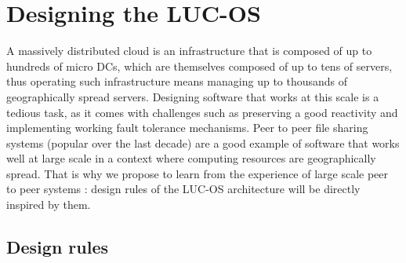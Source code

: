 \section{Designing the LUC-OS}
\label{sec:lucos}

A massively distributed cloud is an infrastructure that is composed of up to 
hundreds of micro DCs, which are themselves composed of up to tens of servers, 
thus operating such infrastructure means managing up to thousands of
geographically spread servers. Designing software that works at this scale is a
tedious task, as it comes with challenges such as preserving a good reactivity 
and implementing working fault tolerance mechanisms. Peer to peer file sharing 
systems (popular over the last decade) are a good example of software that works
well at large scale in a context where computing resources are geographically 
spread. That is why we propose to learn from the experience of large scale peer 
to peer systems : design rules of the LUC-OS architecture will be directly 
inspired by them. 

\subsection{Design rules}

